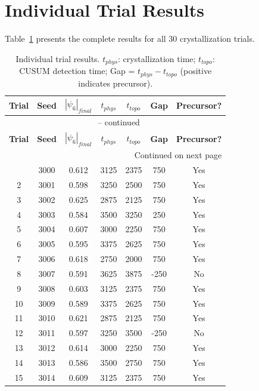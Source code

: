 \documentclass[11pt]{article}
\begin{document}
\section{Individual Trial Results}

Table~\ref{tab:trials} presents the complete results for all 30 crystallization trials.

\begin{longtable}{ccccccc}
\caption{Individual trial results. $t_{phys}$: crystallization time; $t_{topo}$: CUSUM detection time; Gap = $t_{phys} - t_{topo}$ (positive indicates precursor).} \label{tab:trials} \\
\toprule
\textbf{Trial} & \textbf{Seed} & \textbf{$|\psi_6|_{final}$} & \textbf{$t_{phys}$} & \textbf{$t_{topo}$} & \textbf{Gap} & \textbf{Precursor?} \\
\midrule
\endfirsthead
\multicolumn{7}{c}{{\tablename\ \thetable{} -- continued}} \\
\toprule
\textbf{Trial} & \textbf{Seed} & \textbf{$|\psi_6|_{final}$} & \textbf{$t_{phys}$} & \textbf{$t_{topo}$} & \textbf{Gap} & \textbf{Precursor?} \\
\midrule
\endhead
\midrule
\multicolumn{7}{r}{{Continued on next page}} \\
\endfoot
\bottomrule
\endlastfoot
1 & 3000 & 0.612 & 3125 & 2375 & 750 & Yes \\
2 & 3001 & 0.598 & 3250 & 2500 & 750 & Yes \\
3 & 3002 & 0.625 & 2875 & 2125 & 750 & Yes \\
4 & 3003 & 0.584 & 3500 & 3250 & 250 & Yes \\
5 & 3004 & 0.607 & 3000 & 2250 & 750 & Yes \\
6 & 3005 & 0.595 & 3375 & 2625 & 750 & Yes \\
7 & 3006 & 0.618 & 2750 & 2000 & 750 & Yes \\
8 & 3007 & 0.591 & 3625 & 3875 & -250 & No \\
9 & 3008 & 0.603 & 3125 & 2375 & 750 & Yes \\
10 & 3009 & 0.589 & 3375 & 2625 & 750 & Yes \\
11 & 3010 & 0.621 & 2875 & 2125 & 750 & Yes \\
12 & 3011 & 0.597 & 3250 & 3500 & -250 & No \\
13 & 3012 & 0.614 & 3000 & 2250 & 750 & Yes \\
14 & 3013 & 0.586 & 3500 & 2750 & 750 & Yes \\
15 & 3014 & 0.609 & 3125 & 2375 & 750 & Yes \\

\end{longtable}
\end{document}

